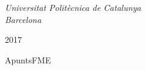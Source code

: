 \begin{titlepage}
	\vspace{5.5\baselineskip} %

	\textit{Universitat Politècnica de Catalunya \\ Barcelona} %

	\vfill %


	\plogo %

	\vspace{0.3\baselineskip} %

	2017 %

	{\large ApuntsFME} %

\end{titlepage}
